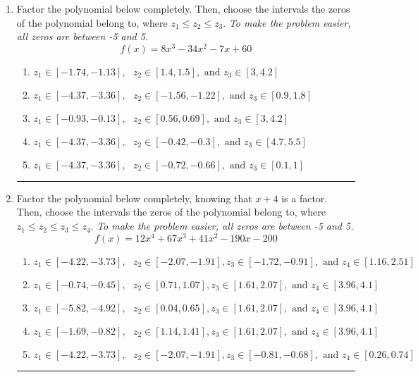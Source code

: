 \documentclass[14pt]{extbook}
\newcommand{\litem}[1]{\item#1\hspace*{-1cm}\rule{\textwidth}{0.4pt}}
\begin{document}
\begin{enumerate}
{\begin{enumerate}[label=\Alph*.]
\end{enumerate} }
\litem{
Factor the polynomial below completely. Then, choose the intervals the zeros of the polynomial belong to, where $z_1 \leq z_2 \leq z_3$. \textit{To make the problem easier, all zeros are between -5 and 5.}\[ f(x) = 8x^{3} -34 x^{2} -7 x + 60 \]\begin{enumerate}[label=\Alph*.]
\item \( z_1 \in [-1.74, -1.13], \text{   }  z_2 \in [1.4, 1.5], \text{   and   } z_3 \in [3, 4.2] \)
\item \( z_1 \in [-4.37, -3.36], \text{   }  z_2 \in [-1.56, -1.22], \text{   and   } z_3 \in [0.9, 1.8] \)
\item \( z_1 \in [-0.93, -0.13], \text{   }  z_2 \in [0.56, 0.69], \text{   and   } z_3 \in [3, 4.2] \)
\item \( z_1 \in [-4.37, -3.36], \text{   }  z_2 \in [-0.42, -0.3], \text{   and   } z_3 \in [4.7, 5.5] \)
\item \( z_1 \in [-4.37, -3.36], \text{   }  z_2 \in [-0.72, -0.66], \text{   and   } z_3 \in [0.1, 1] \)

\end{enumerate} }
\litem{
Factor the polynomial below completely, knowing that $x+4$ is a factor. Then, choose the intervals the zeros of the polynomial belong to, where $z_1 \leq z_2 \leq z_3 \leq z_4$. \textit{To make the problem easier, all zeros are between -5 and 5.}\[ f(x) = 12x^{4} +67 x^{3} +41 x^{2} -190 x -200 \]\begin{enumerate}[label=\Alph*.]
\item \( z_1 \in [-4.22, -3.73], \text{   }  z_2 \in [-2.07, -1.91], z_3 \in [-1.72, -0.91], \text{   and   } z_4 \in [1.16, 2.51] \)
\item \( z_1 \in [-0.74, -0.45], \text{   }  z_2 \in [0.71, 1.07], z_3 \in [1.61, 2.07], \text{   and   } z_4 \in [3.96, 4.1] \)
\item \( z_1 \in [-5.82, -4.92], \text{   }  z_2 \in [0.04, 0.65], z_3 \in [1.61, 2.07], \text{   and   } z_4 \in [3.96, 4.1] \)
\item \( z_1 \in [-1.69, -0.82], \text{   }  z_2 \in [1.14, 1.41], z_3 \in [1.61, 2.07], \text{   and   } z_4 \in [3.96, 4.1] \)
\item \( z_1 \in [-4.22, -3.73], \text{   }  z_2 \in [-2.07, -1.91], z_3 \in [-0.81, -0.68], \text{   and   } z_4 \in [0.26, 0.74] \)


\end{enumerate}}
\end{enumerate}
\end{document}
